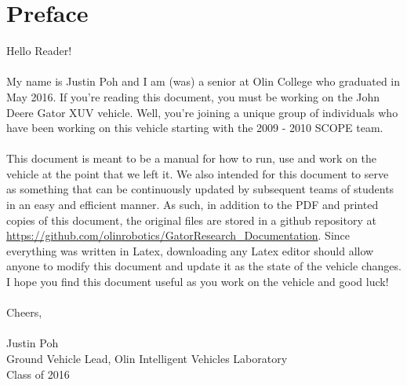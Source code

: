 \chapter{Preface}

Hello Reader! \\ \\
%
\noindent My name is Justin Poh and I am (was) a senior at Olin College who graduated in May 2016. If you're reading this document, you must be working on the John Deere Gator XUV vehicle. Well, you're joining a unique group of individuals who have been working on this vehicle starting with the 2009 - 2010 SCOPE team. \\ \\
%
This document is meant to be a manual for how to run, use and work on the vehicle at the point that we left it. We also intended for this document to serve as something that can be continuously updated by subsequent teams of students in an easy and efficient manner. As such, in addition to the PDF and printed copies of this document, the original files are stored in a github repository at \url{https://github.com/olinrobotics/GatorResearch_Documentation}. Since everything was written in Latex, downloading any Latex editor should allow anyone to modify this document and update it as the state of the vehicle changes. I hope you find this document useful as you work on the vehicle and good luck! \\ \\
%
Cheers,\\ \\
%
Justin Poh\\
Ground Vehicle Lead, Olin Intelligent Vehicles Laboratory\\
Class of 2016